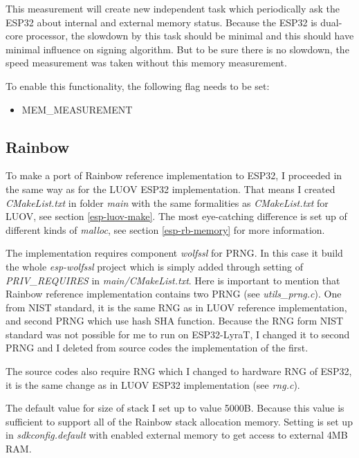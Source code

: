 \documentclass[thesis=M,english]{FITthesis}[2019/12/23]
\begin{document}
\bigskip
\noindent
This measurement will create new independent task which periodically ask the ESP32 about internal and external memory status. Because the ESP32 is dual-core processor, the slowdown by this task should be minimal and this should have minimal influence on signing algorithm. But to be sure there is no slowdown, the speed measurement was taken without this memory measurement.

\bigskip
\noindent
To enable this functionality, the following flag needs to be set:
\begin{itemize}
\item	MEM\_MEASUREMENT
\end{itemize}

\subsection{Rainbow}
To make a port of Rainbow reference implementation to ESP32, I proceeded in the same way as for the LUOV ESP32 implementation. That means I created \textit{CMakeList.txt} in folder \textit{main} with the same formalities as \textit{CMakeList.txt} for LUOV, see section \ref{esp-luov-make}. The most eye-catching difference is set up of different kinds of \textit{malloc}, see section \ref{esp-rb-memory} for more information.

\bigskip
\noindent
The implementation requires component \textit{wolfssl} for PRNG. In this case it build the whole \textit{esp-wolfssl} project which is simply added through setting of \textit{PRIV\_REQUIRES} in \textit{main/CMakeList.txt}. Here is important to mention that Rainbow reference implementation contains two PRNG (see \textit{utils\_prng.c}). One from NIST standard, it is the same RNG as in LUOV reference implementation, and second PRNG which use hash SHA function. Because the RNG form NIST standard was not possible for me to run on ESP32-LyraT, I changed it to second PRNG and  I deleted from source codes the implementation of the first.

\bigskip
\noindent
The source codes also require RNG which I changed to hardware RNG of ESP32, it is the same change as in LUOV ESP32 implementation (see \textit{rng.c}).

\bigskip
\noindent
The default value for size of stack I set up to value 5000B. Because this value is sufficient to support all of the Rainbow stack allocation memory. Setting is set up in \textit{sdkconfig.default} with enabled external memory to get access to external 4MB RAM.
\end{document}

